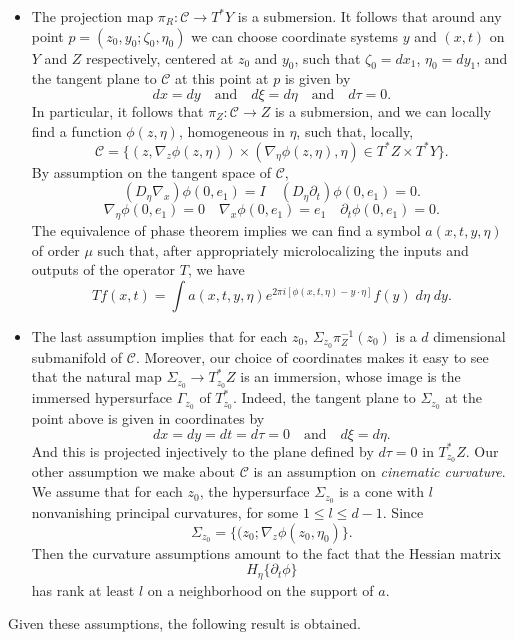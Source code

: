 \begin{itemize}
    \item The projection map $\pi_R: \mathcal{C} \to T^* Y$ is a submersion. It follows that around any point $p = (z_0,y_0;\zeta_0,\eta_0)$ we can choose coordinate systems $y$ and $(x,t)$ on $Y$ and $Z$ respectively, centered at $z_0$ and $y_0$, such that $\zeta_0 = dx_1$, $\eta_0 = dy_1$, and the tangent plane to $\mathcal{C}$ at this point at $p$ is given by
    \[ dx = dy \quad\text{and}\quad d\xi = d\eta \quad\text{and}\quad d\tau = 0. \]
    In particular, it follows that $\pi_Z : \mathcal{C} \to Z$ is a submersion, and we can locally find a function $\phi(z,\eta)$, homogeneous in $\eta$, such that, locally,
    \[ \mathcal{C} = \Big\{ (z, \nabla_z \phi(z,\eta)) \times ( \nabla_\eta \phi(z,\eta), \eta ) \in T^* Z \times T^* Y \Big\}. \]
    By assumption on the tangent space of $\mathcal{C}$,
    \[ (D_\eta \nabla_x) \phi(0, e_1) = I \quad (D_\eta \partial_t) \phi(0,e_1) = 0. \]
    \[ \nabla_\eta \phi(0,e_1) = 0 \quad \nabla_x \phi(0,e_1) = e_1 \quad \partial_t \phi(0,e_1) = 0. \]
    The equivalence of phase theorem implies we can find a symbol $a(x,t,y,\eta)$ of order $\mu$ such that, after appropriately microlocalizing the inputs and outputs of the operator $T$, we have
    \[ Tf(x,t) = \int a(x,t,y,\eta) e^{2 \pi i [\phi(x,t,\eta) - y \cdot \eta]} f(y)\; d \eta\; dy. \]

    \item The last assumption implies that for each $z_0$, $\Sigma_{z_0} \pi_Z^{-1}(z_0)$ is a $d$ dimensional submanifold of $\mathcal{C}$. Moreover, our choice of coordinates makes it easy to see that the natural map $\Sigma_{z_0} \to T^*_{z_0} Z$ is an immersion, whose image is the immersed hypersurface $\Gamma_{z_0}$ of $T^*_{z_0}$. Indeed, the tangent plane to $\Sigma_{z_0}$ at the point above is given in coordinates by
    \[ dx = dy = dt = d\tau = 0 \quad\text{and}\quad d\xi = d\eta. \]
    And this is projected injectively to the plane defined by $d\tau = 0$ in $T^*_{z_0} Z$. Our other assumption we make about $\mathcal{C}$ is an assumption on \emph{cinematic curvature}. We assume that for each $z_0$, the hypersurface $\Sigma_{z_0}$ is a cone with $l$ nonvanishing principal curvatures, for some $1 \leq l \leq d-1$. Since
    \[ \Sigma_{z_0} = \Big\{ (z_0; \nabla_z \phi(z_0,\eta_0) \Big\}. \]
    Then the curvature assumptions amount to the fact that the Hessian matrix
    \[ H_\eta \{ \partial_t \phi \} \]
    has rank at least $l$ on a neighborhood on the support of $a$.
\end{itemize}
%
Given these assumptions, the following result is obtained.

